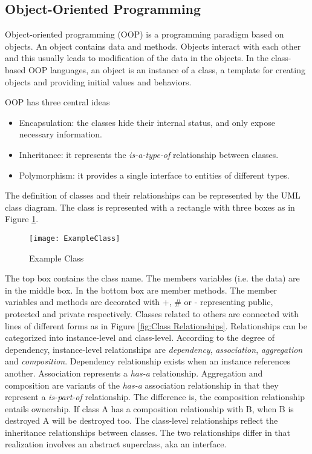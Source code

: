 \subsection{Object-Oriented Programming}
Object-oriented programming (OOP) is a programming paradigm based on objects. An object contains data and methods. Objects interact with each other and this usually leads to modification of the data in the objects. In the class-based OOP languages, an object is an instance of a class, a template for creating objects and providing initial values and behaviors. 

OOP has three central ideas \cite{eckel2003java}
\begin{itemize}
\item Encapsulation: the classes hide their internal status, and only expose necessary information.
\item Inheritance: it represents the \textit{is-a-type-of} relationship between classes.
\item Polymorphism: it provides a single interface to entities of different types.
\end{itemize}

The definition of classes and their relationships can be represented by the UML class diagram. The class is represented with a rectangle with three boxes as in Figure \ref{fig:Example Class}.
\begin{figure}[htb]
\centering
\texttt{[image: ExampleClass]}
\caption{Example Class\label{fig:Example Class}}
\end{figure}
The top box contains the class name. The members variables (i.e. the data) are in the middle box. In the bottom box are member methods. The member variables and methods are decorated with +, \# or - representing public, protected and private respectively. Classes related to others are connected with lines of different forms as in Figure \ref{fig:Class Relationships}. Relationships can be categorized into instance-level and class-level. According to the degree of dependency, instance-level relationships are \textit{dependency}, \textit{association}, \textit{aggregation} and \textit{composition}. Dependency relationship exists when an instance references another. Association represents a \textit{has-a} relationship. Aggregation and composition are variants of the \textit{has-a} association relationship in that they represent a \textit{is-part-of} relationship. The difference is, the composition relationship entails ownership. If class A has a composition relationship with B, when B is destroyed A will be destroyed too. The class-level relationships reflect the inheritance relationships between classes. The two relationships differ in that realization involves an abstract superclass, aka an interface. 

